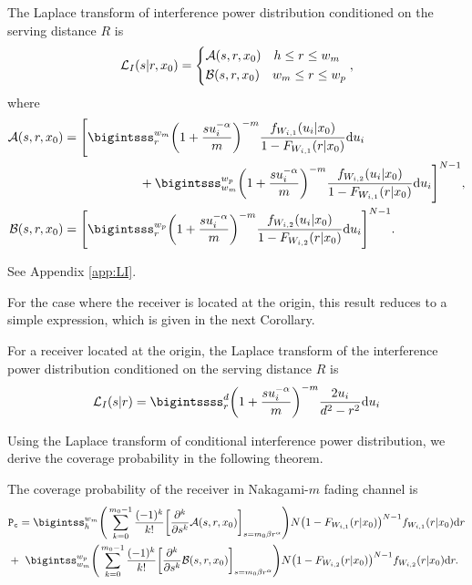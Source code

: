 \documentclass[journal,draftclsnofoot,onecolumn,12pt]{IEEEtran}
\begin{document}
\begin{lemma}\label{lem:LI}
The Laplace transform of interference power distribution conditioned on the serving distance $R$ is
\begin{align}
\mathcal{L}_I(s| r, x_0) = \begin{dcases}
\mathcal{A}(s,r,x_0) \quad h \leq r \leq w_m\\
\mathcal{B}(s,r,x_0) \quad w_m \leq r \leq w_p
\end{dcases},
\end{align}
where 
\begin{align}\notag
\calA(s,r,x_0) &= \Bigg[ \bigintsss_r^{w_m} \bigg( 1 + \frac{s u_i^{-\alpha}}{m} \bigg)^{-m} \frac{f_{W_{i,1}}(u_i|x_0)}{1-F_{W_{i,1}}(r|x_0)} {\rm d}u_i \\
& \qquad \qquad \qquad + \bigintsss_{w_m}^{w_p} \bigg( 1 + \frac{s u_i^{-\alpha}}{m} \bigg)^{-m} \frac{f_{W_{i,2}}(u_i|x_0)}{1-F_{W_{i,1}}(r|x_0)} {\rm d}u_i \Bigg]^{N-1}, \\
\calB(s,r,x_0) &= \Bigg[ \bigintsss_r^{w_p} \bigg( 1 + \frac{s u_i^{-\alpha}}{m} \bigg)^{-m} \frac{f_{W_{i,2}}(u_i|x_0)}{1-F_{W_{i,2}}(r|x_0)} {\rm d}u_i \Bigg]^{N-1}.
\end{align}
\end{lemma}
\begin{IEEEproof}
See Appendix \ref{app:LI}. 
\end{IEEEproof}
For the case where the receiver is located at the origin, this result reduces to a simple expression, which is given in the next Corollary.
\begin{cor}
For a receiver located at the origin, the Laplace transform of the interference power distribution conditioned on the serving distance $R$ is
\begin{align}
\calL_I(s|r) = \bigintssss_r^d \bigg(1 + \frac{su_i^{-\alpha}}{m} \bigg)^{-m} \frac{2 u_i}{d^2-r^2} {\rm d}u_i
\end{align}
\end{cor}
Using the Laplace transform of conditional interference power distribution, we derive the coverage probability in the following theorem.
\begin{thm}\label{thm:pcm}
The coverage probability of the receiver in Nakagami-$m$ fading channel is 
\begin{align} \notag
&\pc = \bigintss_h^{w_m} \Bigg( \sum_{k=0}^{m_0-1} \frac{(-1)^k}{k!} \bigg[ \frac{\partial^k}{\partial s^k} \calA(s,r,x_0) \bigg]_{s=m_0 \T r^{\alpha}} \Bigg) N\big( 1 - F_{W_{i,1}}(r|x_0) \big)^{N-1}f_{W_{i,1}}(r|x_0){\rm d}r \\
&+ \ \bigintss_{w_m}^{w_p} \Bigg( \sum_{k=0}^{m_0-1} \frac{(-1)^k}{k!} \bigg[ \frac{\partial^k}{\partial s^k} \calB(s,r,x_0) \bigg]_{s=m_0 \T r^{\alpha}} \Bigg) N\big( 1 - F_{W_{i,2}}(r|x_0) \big)^{N-1}f_{W_{i,2}}(r|x_0){\rm d}r. 
\end{align}
\end{thm}
\end{document}
